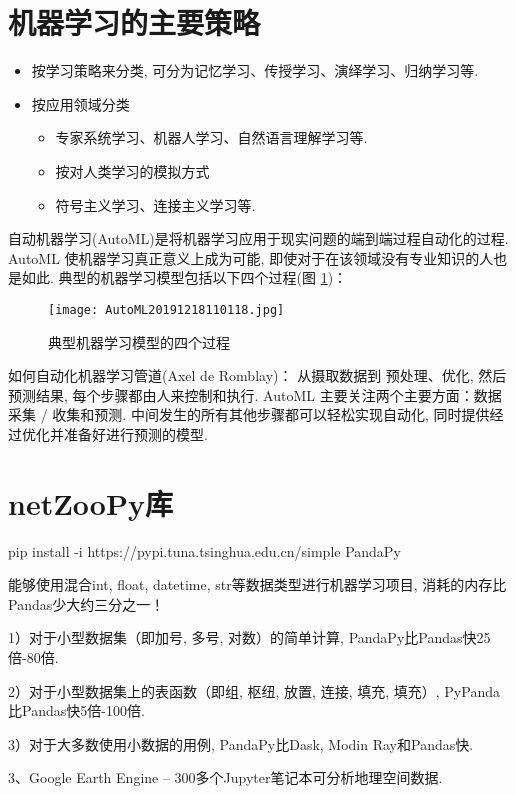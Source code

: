 \section{机器学习的主要策略}
\begin{itemize}
\item 按学习策略来分类, 可分为记忆学习、传授学习、演绎学习、归纳学习等.

\item 按应用领域分类
    \begin{itemize}
      \item 专家系统学习、机器人学习、自然语言理解学习等.
      \item 按对人类学习的模拟方式
      \item 符号主义学习、连接主义学习等.
    \end{itemize}
\end{itemize}

自动机器学习(AutoML)是将机器学习应用于现实问题的端到端过程自动化的过程. AutoML 使机器学习真正意义上成为可能, 即使对于在该领域没有专业知识的人也是如此.
典型的机器学习模型包括以下四个过程(图 \ref{AutoML2019fig2702})：
\begin{figure}[H]
    \centering
    \texttt{[image: AutoML20191218110118.jpg]}
    \caption{典型机器学习模型的四个过程}
    \label{AutoML2019fig2702}
\end{figure}
如何自动化机器学习管道(Axel de Romblay)：
从摄取数据到 预处理、优化, 然后预测结果, 每个步骤都由人来控制和执行. AutoML 主要关注两个主要方面：数据采集 / 收集和预测. 中间发生的所有其他步骤都可以轻松实现自动化, 同时提供经过优化并准备好进行预测的模型.
\section{netZooPy库}

pip install -i https://pypi.tuna.tsinghua.edu.cn/simple PandaPy

能够使用混合int, float, datetime, str等数据类型进行机器学习项目, 消耗的内存比Pandas少大约三分之一！

1）对于小型数据集（即加号, 多号, 对数）的简单计算, PandaPy比Pandas快25倍-80倍.

2）对于小型数据集上的表函数（即组, 枢纽, 放置, 连接, 填充, 填充）, PyPanda比Pandas快5倍-100倍.

3）对于大多数使用小数据的用例, PandaPy比Dask, Modin Ray和Pandas快.

3、Google Earth Engine – 300多个Jupyter笔记本可分析地理空间数据.

